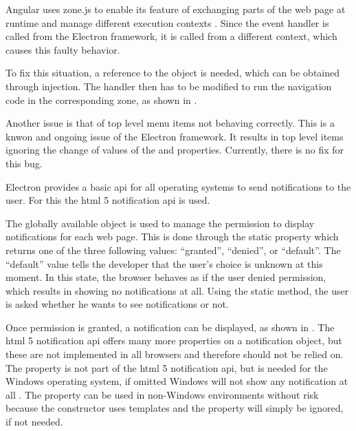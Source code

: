Angular uses zone.js to enable its  feature of exchanging parts of the web page at runtime and manage different execution contexts \cite{zoneJS}. Since the  event handler is called from the Electron framework, it is called from a different context, which causes this faulty behavior.

To fix this situation, a reference to the  object is needed, which can be obtained through injection. The  handler then has to be modified to run the navigation code in the corresponding zone, as shown in .


Another issue is that of top level menu items not behaving correctly. This is a knwon and ongoing issue of the Electron framework. It results in top level items ignoring the change of values of the  and  properties. Currently, there is no fix for this bug. \cite{topMenuItems}


Electron provides a basic \gls{api} for all operating systems to send notifications to the user. For this the \gls{html} 5 notification \gls{api} is used.

The globally available  object is used to manage the permission to display notifications for each web page. This is done through the static  property which returns one of the three following values: \enquote{granted}, \enquote{denied}, or \enquote{default}. The \enquote{default} value tells the developer that the user's choice is unknown at this moment. In this state, the browser behaves as if the user denied permission, which results in showing no notifications at all. Using the static  method, the user is asked whether he wants to see notifications or not.

Once permission is granted, a notification can be displayed, as shown in . The \gls{html} 5 notification \gls{api} offers many more properties on a notification object, but these are not implemented in all browsers and therefore should not be relied on. The  property is not part of the \gls{html} 5 notification \gls{api}, but is needed for the Windows operating system, if omitted Windows will not show any notification at all . The property can be used in non-Windows environments without risk because the constructor uses templates and the property will simply be ignored, if not needed. \cite{mdnNotification}


